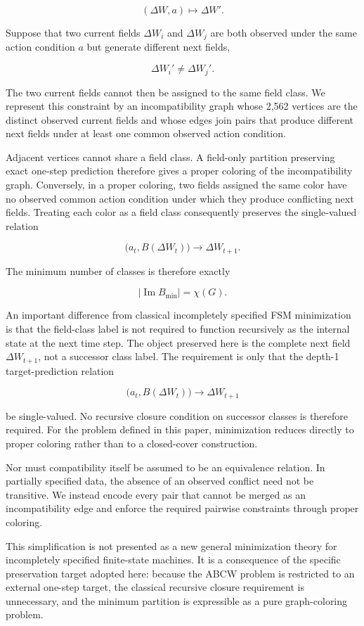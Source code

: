 \documentclass[
  11pt,
]{article}
\begin{document}
\[{(\Delta W,a)\longmapsto\Delta W'.}\]

Suppose that two current fields \({\Delta W_i}\) and \({\Delta W_j}\)
are both observed under the same action condition \({a}\) but generate
different next fields,

\[{\Delta W_i'\neq\Delta W_j'.}\]

The two current fields cannot then be assigned to the same field class.
We represent this constraint by an incompatibility graph whose 2,562
vertices are the distinct observed current fields and whose edges join
pairs that produce different next fields under at least one common
observed action condition.

Adjacent vertices cannot share a field class. A field-only partition
preserving exact one-step prediction therefore gives a proper coloring
of the incompatibility graph. Conversely, in a proper coloring, two
fields assigned the same color have no observed common action condition
under which they produce conflicting next fields. Treating each color as
a field class consequently preserves the single-valued relation

\[{\bigl(a_t,B(\Delta W_t)\bigr)\longrightarrow\Delta W_{t+1}.}\]

The minimum number of classes is therefore exactly

\[{|\operatorname{Im}B_{\min}|=\chi(G).}\]

An important difference from classical incompletely specified FSM
minimization is that the field-class label is not required to function
recursively as the internal state at the next time step. The object
preserved here is the complete next field \({\Delta W_{t+1}}\), not a
successor class label. The requirement is only that the depth-1
target-prediction relation

\[{\bigl(a_t,B(\Delta W_t)\bigr)\longrightarrow\Delta W_{t+1}}\]

be single-valued. No recursive closure condition on successor classes is
therefore required. For the problem defined in this paper, minimization
reduces directly to proper coloring rather than to a closed-cover
construction.

Nor must compatibility itself be assumed to be an equivalence relation.
In partially specified data, the absence of an observed conflict need
not be transitive. We instead encode every pair that cannot be merged as
an incompatibility edge and enforce the required pairwise constraints
through proper coloring.

This simplification is not presented as a new general minimization
theory for incompletely specified finite-state machines. It is a
consequence of the specific preservation target adopted here: because
the ABCW problem is restricted to an external one-step target, the
classical recursive closure requirement is unnecessary, and the minimum
partition is expressible as a pure graph-coloring problem.
\end{document}
